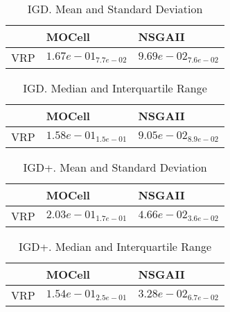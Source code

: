 \documentclass{article}
\begin{document}
\begin{table}
\caption{IGD. Mean and Standard Deviation}
\label{table: IGD}
\centering
\begin{scriptsize}
\begin{tabular}{lll}
\hline & MOCell &  NSGAII\\
\hline 
VRP & \cellcolor{gray25}$  1.67e-01_{ 7.7e-02}$ & \cellcolor{gray95}$  9.69e-02_{ 7.6e-02}$ \\
\hline
\end{tabular}
\end{scriptsize}
\end{table}

\begin{table}
\caption{IGD. Median and Interquartile Range}
\label{table: IGD}
\centering
\begin{scriptsize}
\begin{tabular}{lll}
\hline & MOCell &  NSGAII\\
\hline 
VRP & \cellcolor{gray25}$  1.58e-01_{ 1.5e-01}$ & \cellcolor{gray95}$  9.05e-02_{ 8.9e-02}$ \\
\hline
\end{tabular}
\end{scriptsize}
\end{table}

\begin{table}
\caption{IGD+. Mean and Standard Deviation}
\label{table: IGD+}
\centering
\begin{scriptsize}
\begin{tabular}{lll}
\hline & MOCell &  NSGAII\\
\hline 
VRP & \cellcolor{gray25}$  2.03e-01_{ 1.7e-01}$ & \cellcolor{gray95}$  4.66e-02_{ 3.6e-02}$ \\
\hline
\end{tabular}
\end{scriptsize}
\end{table}

\begin{table}
\caption{IGD+. Median and Interquartile Range}
\label{table: IGD+}
\centering
\begin{scriptsize}
\begin{tabular}{lll}
\hline & MOCell &  NSGAII\\
\hline 
VRP & \cellcolor{gray25}$  1.54e-01_{ 2.5e-01}$ & \cellcolor{gray95}$  3.28e-02_{ 6.7e-02}$ \\
\hline
\end{tabular}
\end{scriptsize}
\end{table}
\end{document}
